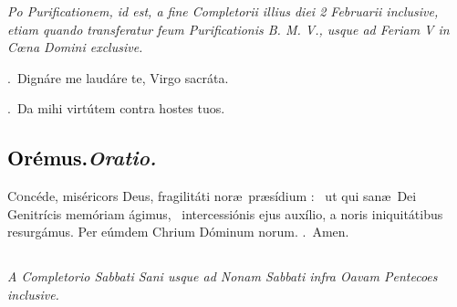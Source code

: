 \documentclass[12pt]{article} %
\newenvironment{rubric}{\vspace{2 mm}\color{benred8} \itshape \leftskip 0in \setlength{\parindent}{0.25in}}{\vspace{2 mm}}
\newenvironment{response}{\leftskip 0in \setlength{\parindent}{0in}}{\vspace{2 mm}}
\let\oldgresixstar\gresixstar
\renewcommand{\gresixstar}{\textcolor{benred8}{\oldgresixstar}}
\let\oldgredagger\gredagger
\renewcommand{\gredagger}{\textcolor{benred8}{\oldgredagger}}
\let\oldVbar\Vbar
\renewcommand{\Vbar}{\textcolor{benred8}{\oldVbar .}}
\let\oldRbar\Rbar
\renewcommand{\Rbar}{\textcolor{benred8}{\oldRbar .}}
\def\capitulumSpace{\hspace{20 mm}}
\begin{document}

\newpage

\begin{rubric}Po Purificationem, id est, a fine Completorii illius diei 2 Februarii inclusive, etiam quando transferatur feum Purificationis B. M. V., usque ad Feriam V in C\oe na Domini exclusive.\end{rubric}


\gresetfirstlineaboveinitial{\small \textsc{ \textbf{\textcolor{benred8}{VI}}}}{\small \textsc{ \textbf{\textcolor{benred8}{VI}}}}

\vspace{2mm}

\begin{response}
\Vbar\ Dign\'{a}re me laud\'{a}re te, Virgo sacr\'{a}ta.

\Rbar\ Da mihi virt\'{u}tem contra hostes tuos.

\end{response}

\subsection*{\textcolor{black}{Or\'{e}mus.}\capitulumSpace \emph{Oratio.}}

\begin{response}\lettrine{C}{o}nc\'{e}de, mis\'{e}ricors Deus, fragilit\'{a}ti nor\ae\ pr\ae s\'{i}dium : \gredagger\ ut qui san\ae\ Dei Genitr\'{i}cis mem\'{o}riam \'{a}gimus, \gresixstar\ intercessi\'{o}nis ejus aux\'{i}lio, a noris iniquit\'{a}tibus resurg\'{a}mus. Per e\'{u}mdem Chrium D\'{o}minum norum. \Rbar\ Amen.

\end{response}


\subsection*{}

\begin{rubric}
A Completorio Sabbati Sani usque ad Nonam Sabbati infra Oavam Pentecoes inclusive.

\end{rubric}
\end{document}
